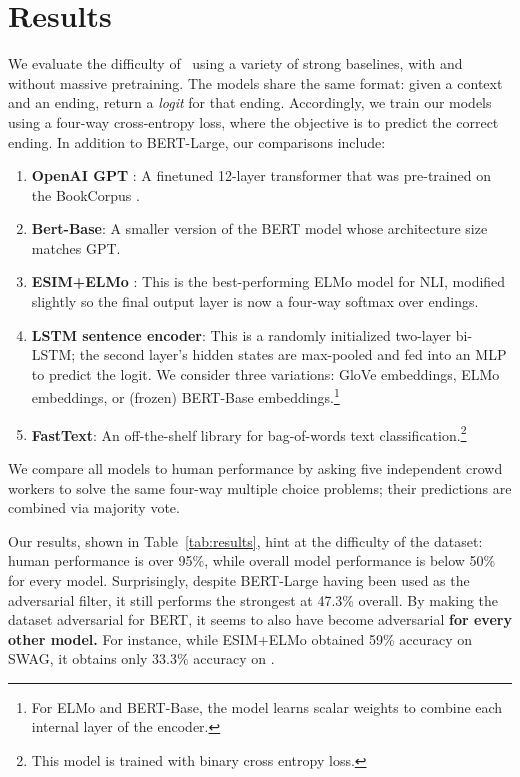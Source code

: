 \section{Results}

We evaluate the difficulty of {}~using a variety of strong baselines, with and without massive pretraining. The models share the same format: given a context and an ending, return a \emph{logit} for that ending. Accordingly, we train our models using a four-way cross-entropy loss, where the objective is to predict the correct ending. In addition to BERT-Large, our comparisons include:

\begin{enumerate}[wide, labelwidth=!,labelindent=0pt,noitemsep,topsep=0pt,label=\textbf{\alph*}.]
\item {\bf OpenAI GPT} \cite{radford2018improving}: A finetuned 12-layer transformer that was pre-trained on the BookCorpus \cite{moviebook}.
\item {\bf Bert-Base}: A smaller version of the BERT model whose architecture size matches GPT.
\item {\bf ESIM+ELMo} \cite{chen2017enhanced, peters2018deep}: This is the best-performing ELMo model for NLI, modified slightly so the final output layer is now a four-way softmax over endings.
\item {\bf LSTM sentence encoder}: This is a randomly initialized two-layer bi-LSTM; the second layer's hidden states are max-pooled and fed into an MLP to predict the logit. We consider three variations: GloVe embeddings, ELMo embeddings, or (frozen) BERT-Base embeddings.\footnote{For ELMo and BERT-Base, the model learns scalar weights to combine each internal layer of the encoder.}

\item {\bf FastText}: \cite{joulin2017bag} An off-the-shelf library for bag-of-words text classification.\footnote{This model is trained with binary cross entropy loss.}
\end{enumerate}

We compare all models to human performance by asking five independent crowd workers to solve the same four-way multiple choice problems; their predictions are combined via majority vote.

Our results, shown in Table~\ref{tab:results}, hint at the difficulty of the dataset: human performance is over 95\%, while overall model performance is below 50\% for every model. Surprisingly, despite BERT-Large having been used as the adversarial filter, it still performs the strongest at 47.3\% overall. By making the dataset adversarial for BERT, it seems to also have become adversarial \textbf{for every other model.} For instance, while ESIM+ELMo obtained 59\% accuracy on {SWAG}, it obtains only 33.3\% accuracy on {}.

